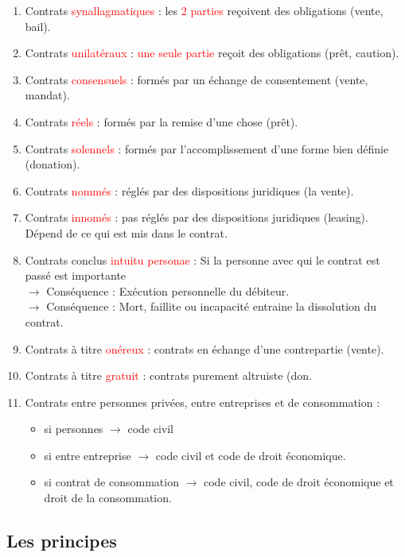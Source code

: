 \begin{enumerate}
	\item Contrats \textcolor{red}{synallagmatiques} : les \textcolor{red}{2 parties} reçoivent des obligations (vente, bail).
	\item Contrats \textcolor{red}{unilatéraux} : \textcolor{red}{une seule partie} reçoit des obligations (prêt, caution).
	\item Contrats \textcolor{red}{consensuels} : formés par un échange de consentement (vente, mandat).
	\item Contrats \textcolor{red}{réels} : formés par la remise d'une chose (prêt).
	\item Contrats \textcolor{red}{solennels} : formés par l'accomplissement d'une forme bien définie (donation).
	\item Contrats \textcolor{red}{nommés} : réglés par des dispositions juridiques (la vente).
	\item Contrats \textcolor{red}{innomés} : pas réglés par des dispositions juridiques (leasing). Dépend de ce qui est mis dans le contrat.
	\item Contrats conclus \textcolor{red}{intuitu personae} : Si la personne avec qui le contrat est passé est importante\\
	$\rightarrow$ Conséquence : Exécution personnelle du débiteur.\\
    $\rightarrow$ Conséquence : Mort, faillite ou incapacité entraine la dissolution du contrat.
    \item Contrats à titre \textcolor{red}{onéreux} : contrats en échange d'une contrepartie (vente).
    \item Contrats à titre \textcolor{red}{gratuit} : contrats purement altruiste (don.
    \bigskip\medskip
    \item Contrats entre personnes privées, entre entreprises et de consommation :
    \begin{itemize}
        	\item si personnes $\rightarrow$ code civil
        	\item si entre entreprise $\rightarrow$ code civil et code de droit économique.
        	\item si contrat de consommation $\rightarrow$ code civil, code de droit économique et droit de la consommation.
    \end{itemize}
\end{enumerate}

\subsection{Les principes}

